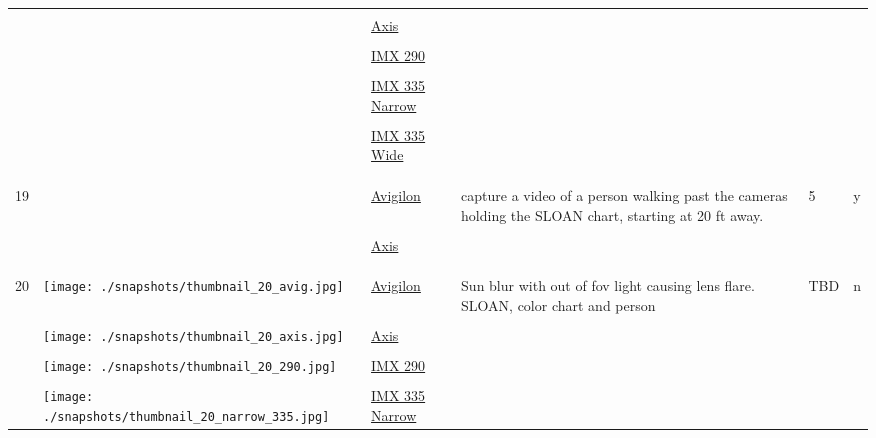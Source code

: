 \documentclass{article}%
\begin{document}
\begin{longtabu}{m{2.5cm} m{4cm} m{2cm} m{4cm} m{2cm} m{2cm}}
&&&&&\\%
&&\href{https://drive.google.com/file/d/1-qcgwIeB-aKKPN4876UKK7xUrmr5qoIq/view?usp=sharing}{Axis}&&&\\%
&&&&&\\%
&&\href{https://drive.google.com/file/d/1Iu1EfLJeHXa_JjDllOpr4-4cYTW-A6Qi/view?usp=sharing}{IMX 290}&&&\\%
&&&&&\\%
&&\href{https://drive.google.com/file/d/1vJurSPq0d2-cwRqFMI4j0Qtn5R3tj9Yf/view?usp=sharing}{IMX 335 Narrow}&&&\\%
&&&&&\\%
&&\href{https://drive.google.com/file/d/1WiUEC6ezI_au_0h3I4fXktTtXZvN71U1/view?usp=sharing}{IMX 335 Wide}&&&\\%
&&&&&\\%
&&&&&\\%
\hline%
&&&&&\\%
19&&\href{https://drive.google.com/file/d/1MypfVfnqdCmO7k3TIUOi_xsSDUAeejEr/view?usp=sharing}{Avigilon}&capture a video of a person walking past the cameras holding the SLOAN chart, starting at 20 ft away.&5&y\\%
&&&&&\\%
&&\href{https://drive.google.com/file/d/1Te8pv5D3VoVtNM7divX0yjCCQKAPuWkI/view?usp=sharing}{Axis}&&&\\%
&&&&&\\%
&&&&&\\%
\hline%
&&&&&\\%
20&\texttt{[image: ./snapshots/thumbnail\_20\_avig.jpg]}&\href{https://drive.google.com/file/d/1trMoN4_Qj6rcwCSOHmtkgjWLLSku7EkM/view?usp=sharing}{Avigilon}&Sun blur with out of fov light causing lens flare. SLOAN, color chart and person&TBD&n\\%
&&&&&\\%
&\texttt{[image: ./snapshots/thumbnail\_20\_axis.jpg]}&\href{https://drive.google.com/file/d/1vB1T6RgYJtf6zrmMJLaJG1hKovBnLq4O/view?usp=sharing}{Axis}&&&\\%
&&&&&\\%
&\texttt{[image: ./snapshots/thumbnail\_20\_290.jpg]}&\href{https://drive.google.com/file/d/1T-HAzKTL7PPchgBkOmDlhMyL-z_yinWA/view?usp=sharing}{IMX 290}&&&\\%
&&&&&\\%
&\texttt{[image: ./snapshots/thumbnail\_20\_narrow\_335.jpg]}&\href{https://drive.google.com/file/d/1uXhZv2HW6MxM04QiKPT79yJOb8IPqreU/view?usp=sharing}{IMX 335 Narrow}&&&\\%

\end{longtabu}
\end{document}
